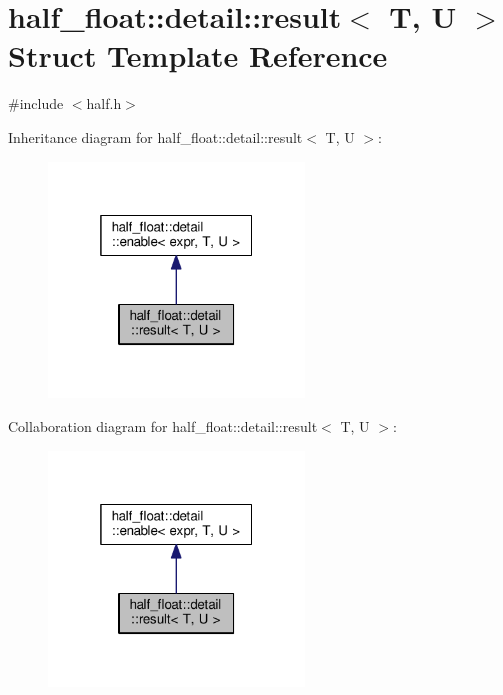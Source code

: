 \hypertarget{structhalf__float_1_1detail_1_1result}{}\section{half\+\_\+float\+:\+:detail\+:\+:result$<$ T, U $>$ Struct Template Reference}
\label{structhalf__float_1_1detail_1_1result}


{\ttfamily \#include $<$half.\+h$>$}



Inheritance diagram for half\+\_\+float\+:\+:detail\+:\+:result$<$ T, U $>$\+:
\nopagebreak
\begin{figure}[H]
\begin{center}
\leavevmode
\includegraphics[width=193pt]{structhalf__float_1_1detail_1_1result__inherit__graph}
\end{center}
\end{figure}


Collaboration diagram for half\+\_\+float\+:\+:detail\+:\+:result$<$ T, U $>$\+:
\nopagebreak
\begin{figure}[H]
\begin{center}
\leavevmode
\includegraphics[width=193pt]{structhalf__float_1_1detail_1_1result__coll__graph}
\end{center}
\end{figure}


